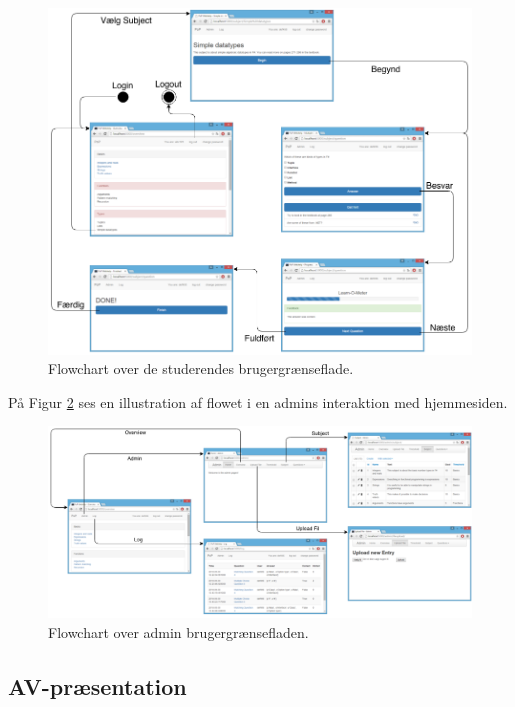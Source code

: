 \documentclass[11pt, a4paper]{article}
\begin{document}
\begin{figure}[htpb]
    \centering
    \includegraphics[width=1\linewidth]{figures/interface/flow_student.png}
    \caption{Flowchart over de studerendes brugergrænseflade.}
    \label{fig:flow_chart_student}
\end{figure}
\FloatBarrier

På Figur \ref{fig:flow_chart_admin} ses en illustration af flowet i en admins interaktion med hjemmesiden.

\begin{figure}[htpb]
    \centering
    \includegraphics[width=1\linewidth]{figures/interface/flow_admin.png}
    \caption{Flowchart over admin brugergrænsefladen.}
    \label{fig:flow_chart_admin}
\end{figure}
\FloatBarrier

\subsection{AV-præsentation}
\label{sub:av_praesentation}
\end{document}
